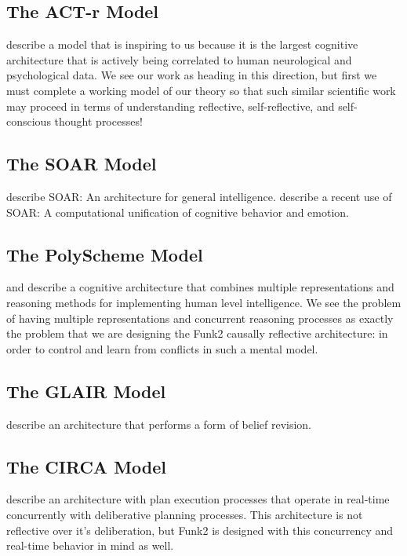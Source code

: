 \subsection{The ACT-r Model}

\cite{anderson:2004} describe a model that is inspiring to us because it is the largest cognitive architecture that is actively being correlated to human neurological and psychological data.
We see our work as heading in this direction, but first we must complete a working model of our theory so that such similar scientific work may proceed in terms of understanding reflective, self-reflective, and self-conscious thought processes!

\subsection{The SOAR Model}

\cite{laird:1987} describe SOAR: An architecture for general intelligence.
\cite{marinier:2009} describe a recent use of SOAR: A computational unification of cognitive behavior and emotion.

\subsection{The PolyScheme Model}

\cite{cassimatis:2004} and \cite{cassimatis:2006} describe a cognitive architecture that combines multiple representations and reasoning methods for implementing human level intelligence.
We see the problem of having multiple representations and concurrent reasoning processes as exactly the problem that we are designing the Funk2 causally reflective architecture: in order to control and learn from conflicts in such a mental model.

\subsection{The GLAIR Model}

\cite{shapiro:2003} describe an architecture that performs a form of belief revision.

\subsection{The CIRCA Model}

\cite{musliner:2001} describe an architecture with plan execution processes that operate in real-time concurrently with deliberative planning processes.
This architecture is not reflective over it's deliberation, but Funk2 is designed with this concurrency and real-time behavior in mind as well.

